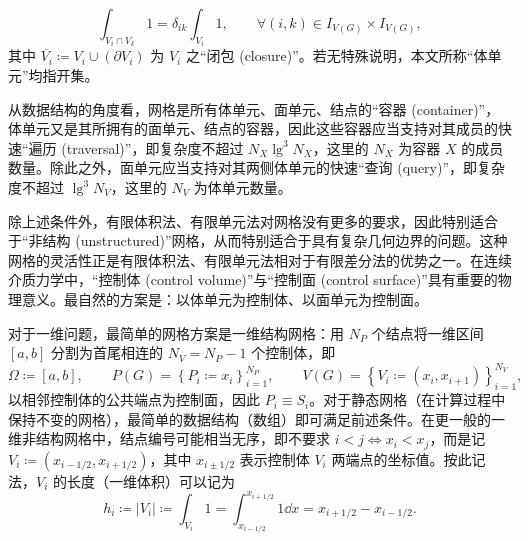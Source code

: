 \begin{equation}
\int_{V_{i}\cap V_{k}}1=\delta_{ik}\int_{V_{i}}1,\qquad\forall(i,k)\in I_{V(G)}\times I_{V(G)},
\end{equation}
其中 $\overline{V_{i}}\coloneqq V_{i}\cup(\partial V_{i})$ 为 $V_{i}$
之“闭包 (closure)”。若无特殊说明，本文所称“体单元”均指开集。

从数据结构的角度看，网格是所有体单元、面单元、结点的“容器 (container)”，体单元又是其所拥有的面单元、结点的容器，因此这些容器应当支持对其成员的快速“遍历
(traversal)”，即复杂度不超过 $N_{X}\lg^{3}N_{X}$，这里的 $N_{X}$ 为容器 $X$ 的成员数量。除此之外，面单元应当支持对其两侧体单元的快速“查询
(query)”，即复杂度不超过 $\lg^{3}N_{V}$，这里的 $N_{V}$ 为体单元数量。

除上述条件外，有限体积法、有限单元法对网格没有更多的要求，因此特别适合于“非结构 (unstructured)”网格，从而特别适合于具有复杂几何边界的问题。这种网格的灵活性正是有限体积法、有限单元法相对于有限差分法的优势之一。在连续介质力学中，“控制体
(control volume)”与“控制面 (control surface)”具有重要的物理意义。最自然的方案是：以体单元为控制体、以面单元为控制面。

对于一维问题，最简单的网格方案是一维结构网格：用 $N_{P}$ 个结点将一维区间 $[a,b]$ 分割为首尾相连的 $N_{V}=N_{P}-1$
个控制体，即
\begin{equation}
\varOmega\coloneqq[a,b],\qquad P(G)=\left\{ P_{i}\coloneqq x_{i}\right\} _{i=1}^{N_{P}},\qquad V(G)=\left\{ V_{i}\coloneqq(x_{i},x_{i+1})\right\} _{i=1}^{N_{V}},
\end{equation}
以相邻控制体的公共端点为控制面，因此 $P_{i}\equiv S_{i}$。对于静态网格（在计算过程中保持不变的网格），最简单的数据结构（数组）即可满足前述条件。在更一般的一维非结构网格中，结点编号可能相当无序，即不要求
$i<j\iff x_{i}<x_{j}$，而是记 $V_{i}\coloneqq(x_{i-1/2},x_{i+1/2})$，其中
$x_{i\pm1/2}$ 表示控制体 $V_{i}$ 两端点的坐标值。按此记法，$V_{i}$
的长度（一维体积）可以记为
\begin{equation}
h_{i}\coloneqq\vert V_{i}\vert\coloneqq\int_{V_{i}}1=\int_{x_{i-1/2}}^{x_{i+1/2}}1\dd{x}=x_{i+1/2}-x_{i-1/2}.
\end{equation}

